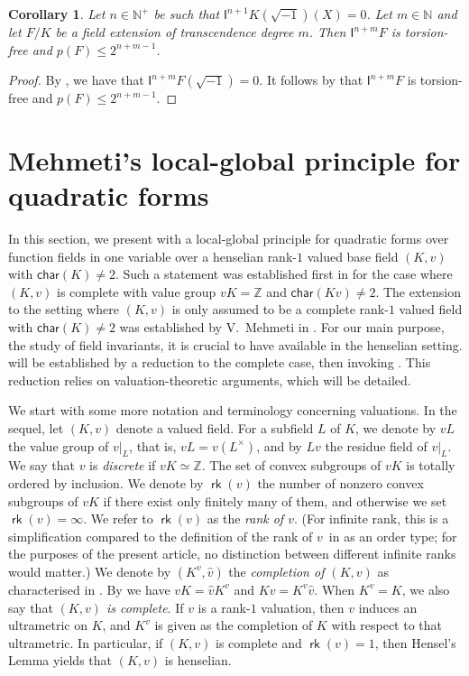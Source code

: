 \documentclass[12pt,leqno]{amsart}
\newcommand{\nat}{\mathbb{N}}
\newcommand{\zz}{\mathbb Z}
\newcommand{\mg}[1]{#1^{\times}}
\DeclareMathOperator{\rk}{\mathsf{rk}}
\newcommand{\car}{\mathsf{char}}
\renewcommand{\leq}{\leqslant}
\newcommand{\I}{\mathsf{I}}
\numberwithin{equation}{section}
\newtheorem{cor}[equation]{Corollary}
\theoremstyle{definition}
\theoremstyle{plain}
\begin{document}
\begin{cor}\label{C:transcendental-torsfree-p-bound}
Let $n\in\nat^+$ be such that $\I^{n+1}K(\sqrt{-1})(X)=0$.
Let $m\in\nat$ and let $F/K$ be a field extension of transcendence degree $m$. 
Then $\I^{n+m}F$ is torsion-free and $p(F)\leq 2^{n+m-1}$.
\end{cor}
\begin{proof}
By , we have that $\I^{n+m}F(\sqrt{-1})=0$.
It follows by  that $\I^{n+m}F$ is torsion-free and $p(F)\leq 2^{n+m-1}$.
\end{proof}

\section{Mehmeti's local-global principle for quadratic forms} 

\label{S:Mehmeti}

In this section, we present with  a local-global principle for quadratic forms over function fields in one variable over a henselian rank-$1$ valued base field $(K,v)$ with $\car(K)\neq 2$.
Such a statement was established first in \cite[Theorem 3.1]{CTPS12} for the case where $(K,v)$ is complete with value group $vK=\zz$ and $\car(Kv)\neq 2$.
The extension to the setting where $(K,v)$ is only assumed to be a complete rank-$1$ valued field with $\car(K)\neq 2$ was established by V.~Mehmeti in \cite{Meh19}. 
For our main purpose, the study of field invariants, it is crucial to have  available 
in the henselian setting.
 will be established by a reduction to the complete case, then invoking \cite[Cor.~3.19 \& Rem.~3.20]{Meh19}.
This reduction relies on valuation-theoretic arguments, which will be detailed. 

We start with some more notation and terminology concerning valuations.
In the sequel, let $(K,v)$ denote a valued field.
For a subfield $L$ of $K$, we denote by $vL$ the value group of $v|_L$, that is, $vL=v(\mg{L})$, and by $Lv$ the residue field of $v|_L$.
We say that $v$ is \emph{discrete} if  $vK\simeq \mathbb{Z}$.
The set of convex subgroups of $vK$ is totally ordered by inclusion. 
We denote by $\rk(v)$ the number of nonzero convex subgroups of $vK$ if there exist only finitely many of them, and otherwise we set $\rk(v)=\infty$.
We refer to $\rk(v)$ as the \emph{rank of $v$}.
(For infinite rank, this is a simplification compared to the definition of the rank of $v$~in \cite[Sect.~2.1]{EP05} as an order type; for the purposes of the present article, no distinction between different infinite ranks would matter.)
We denote by $(K^v,\hat{v})$ the \emph{completion of $(K,v)$} as characterised in \cite[Theorem 2.4.3]{EP05}. 
By \cite[Prop.~2.4.4]{EP05} we have $vK = \hat{v}K^v$ and $Kv = K^v\hat{v}$. When $K^v=K$, we also say that \emph{$(K,v)$ is complete}.
If $v$ is a rank-$1$ valuation, then $v$ induces an ultrametric on $K$, and $K^v$ is given as the completion of $K$ with respect to that ultrametric.
In particular, if  $(K,v)$ is complete and $\rk(v)=1$, then  Hensel's Lemma \cite[Theorem 1.3.1]{EP05} yields that $(K,v)$ is henselian.
\end{document}
